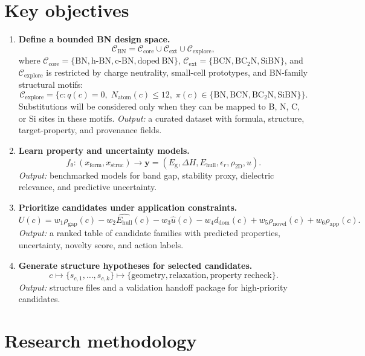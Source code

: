 \documentclass[10pt]{article}
\newcommand{\eg}{E_{\mathrm{g}}}
\newcommand{\ehull}{E_{\mathrm{hull}}}
\newcommand{\form}{x_{\mathrm{form}}}
\newcommand{\struc}{x_{\mathrm{struc}}}
\newcommand{\unc}{u}
\newcommand{\domain}{d_{\mathrm{dom}}}
\newcommand{\utility}{U}
\newcommand{\gapscore}{\rho_{\mathrm{gap}}}
\begin{document}
\section*{Key objectives}
\begin{enumerate}
  \item \textbf{Define a bounded BN design space.}
  \[
    \mathcal{C}_{\mathrm{BN}}=
    \mathcal{C}_{\mathrm{core}}\cup\mathcal{C}_{\mathrm{ext}}\cup
    \mathcal{C}_{\mathrm{explore}},
  \]
  where $\mathcal{C}_{\mathrm{core}}=\{\mathrm{BN},\mathrm{h\mbox{-}BN},
  \mathrm{c\mbox{-}BN},\mathrm{doped\ BN}\}$,
  $\mathcal{C}_{\mathrm{ext}}=\{\mathrm{BCN},\mathrm{BC_2N},\mathrm{SiBN}\}$,
  and $\mathcal{C}_{\mathrm{explore}}$ is restricted by charge neutrality,
  small-cell prototypes, and BN-family structural motifs:
  \[
    \mathcal{C}_{\mathrm{explore}}=
    \{c: q(c)=0,\;N_{\mathrm{atom}}(c)\le 12,\;
    \pi(c)\in\{\mathrm{BN},\mathrm{BCN},\mathrm{BC_2N},\mathrm{SiBN}\}\}.
  \]
  Substitutions will be considered only when they can be mapped to B, N, C,
  or Si sites in these motifs.
  \textit{Output:} a curated dataset with formula, structure, target-property,
  and provenance fields.

  \item \textbf{Learn property and uncertainty models.}
  \[
    f_{\theta}:(\form,\struc)\rightarrow
    \mathbf{y}=(\eg,\Delta H,\ehull,\epsilon_r,\rho_{\mathrm{2D}},\unc).
  \]
  \textit{Output:} benchmarked models for band gap, stability proxy, dielectric
  relevance, and predictive uncertainty.

  \item \textbf{Prioritize candidates under application constraints.}
  \[
    \utility(c)=w_1\gapscore(c)-w_2\hat{\ehull}(c)-w_3\hat{\unc}(c)
    -w_4\domain(c)+w_5\rho_{\mathrm{novel}}(c)+w_6\rho_{\mathrm{app}}(c).
  \]
  \textit{Output:} a ranked table of candidate families with predicted
  properties, uncertainty, novelty score, and action labels.

  \item \textbf{Generate structure hypotheses for selected candidates.}
  \[
    c \mapsto \{s_{c,1},\ldots,s_{c,k}\}
    \mapsto \{\mathrm{geometry},\mathrm{relaxation},\mathrm{property\;recheck}\}.
  \]
  \textit{Output:} structure files and a validation handoff package for
  high-priority candidates.
\end{enumerate}

\section*{Research methodology}
\end{document}
